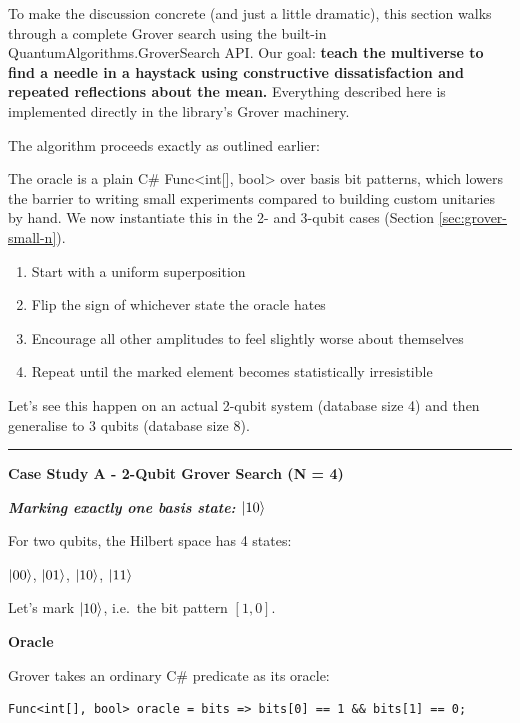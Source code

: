 \documentclass[a4paper,11pt]{article}
\begin{document}
To make the discussion concrete (and just a little dramatic), this section walks through a complete Grover search using the built-in QuantumAlgorithms.GroverSearch API. Our goal: \textbf{teach the multiverse to find a needle in a haystack using constructive dissatisfaction and repeated reflections about the mean.} Everything described here is implemented directly in the library's Grover machinery.

The algorithm proceeds exactly as outlined earlier:

The oracle is a plain C\# Func\textless int{[}{]}, bool\textgreater{} over basis bit patterns, which lowers the barrier to writing small experiments compared to building custom unitaries by hand. We now instantiate this in the 2- and 3-qubit cases (Section \ref{sec:grover-small-n}).
\begin{enumerate}
\def\labelenumi{\arabic{enumi}.}
\item
  Start with a uniform superposition
\item
  Flip the sign of whichever state the oracle hates
\item
  Encourage all other amplitudes to feel slightly worse about themselves
\item
  Repeat until the marked element becomes statistically irresistible
\end{enumerate}

Let's see this happen on an actual 2-qubit system (database size 4) and then generalise to 3 qubits (database size 8).

\begin{center}\rule{0.5\linewidth}{0.5pt}\end{center}

\textbf{Case Study A - 2-Qubit Grover Search (N = 4)}

\emph{\textbf{Marking exactly one basis state: $\lvert 10 \rangle$}}

For two qubits, the Hilbert space has 4 states:

$\lvert 00 \rangle$, $\lvert 01 \rangle$, $\lvert 10 \rangle$, $\lvert 11 \rangle$

Let's mark \textbf{$\lvert 10 \rangle$}, i.e.\ the bit pattern $[1, 0]$.

\textbf{Oracle}

Grover takes an ordinary C\# predicate as its oracle:

\begin{lstlisting}[style=codeblock]
Func<int[], bool> oracle = bits => bits[0] == 1 && bits[1] == 0;
\end{lstlisting}
\end{document}
